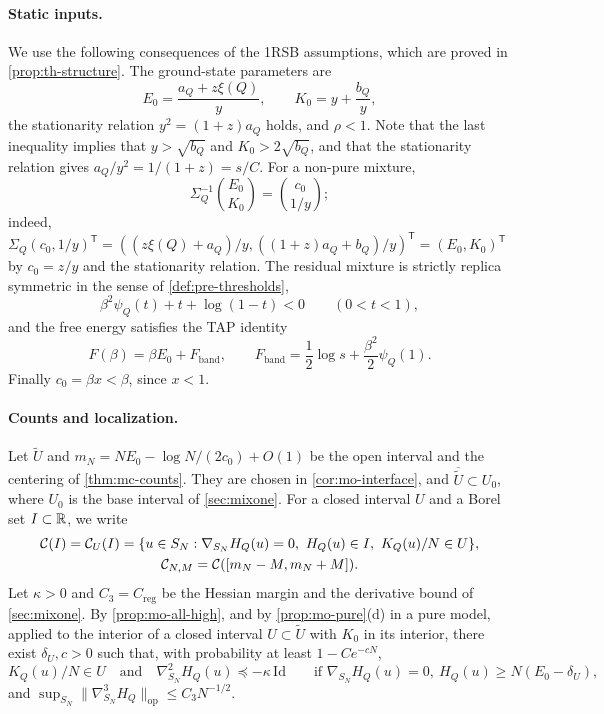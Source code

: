\paragraph{Static inputs.}
We use the following consequences of the 1RSB assumptions, which are proved in \cref{prop:th-structure}. The ground-state parameters are
\begin{equation}\label{eq:mb-marks}
E_0=\frac{a_Q+z\xi(Q)}{y},\qquad K_0=y+\frac{b_Q}{y},
\end{equation}
the stationarity relation $y^2=(1+z)a_Q$ holds, and $\rho<1$. Note that the last inequality implies that $y>\sqrt{b_Q}$ and $K_0>2\sqrt{b_Q}$, and that the stationarity relation gives $a_Q/y^2=1/(1+z)=s/C$. For a non-pure mixture,
\begin{equation}\label{eq:mb-score}
\Sigma_Q^{-1}\binom{E_0}{K_0}=\binom{c_0}{1/y};
\end{equation}
indeed, $\Sigma_Q(c_0,1/y)^{\mathsf T}=((z\xi(Q)+a_Q)/y,((1+z)a_Q+b_Q)/y)^{\mathsf T}=(E_0,K_0)^{\mathsf T}$ by $c_0=z/y$ and the stationarity relation. The residual mixture is strictly replica symmetric in the sense of \cref{def:pre-thresholds},
\begin{equation}\label{eq:mb-residual-rs}
\beta^2\psi_Q(t)+t+\log(1-t)<0\qquad(0<t<1),
\end{equation}
and the free energy satisfies the TAP identity
\begin{equation}\label{eq:mb-tap}
F(\beta)=\beta E_0+F_{\mathrm{band}},\qquad F_{\mathrm{band}}=\frac12\log s+\frac{\beta^2}2\psi_Q(1).
\end{equation}
Finally $c_0=\beta x<\beta$, since $x<1$.

\paragraph{Counts and localization.}
Let $\widetilde U$ and $m_N=NE_0-\log N/(2c_0)+O(1)$ be the open interval and the centering of \cref{thm:mc-counts}. They are chosen in \cref{cor:mo-interface}, and $\overline{\widetilde U}\subset U_0$, where $U_0$ is the base interval of \cref{sec:mixone}. For a closed interval $U$ and a Borel set $I\subset\mathbb R$, we write
\begin{equation}\label{eq:mb-centers}
\begin{gathered}
\cC(I)=\cC_U(I)=\{u\in S_N:\nabla_{S_N}H_Q(u)=0,\ H_Q(u)\in I,\ K_Q(u)/N\in U\},\\
\cC_{N,M}=\cC([m_N-M,m_N+M]).
\end{gathered}
\end{equation}
Let $\kappa>0$ and $C_3=C_{\mathrm{reg}}$ be the Hessian margin and the derivative bound of \cref{sec:mixone}. By \cref{prop:mo-all-high}, and by \cref{prop:mo-pure}(d) in a pure model, applied to the interior of a closed interval $U\subset\widetilde U$ with $K_0$ in its interior, there exist $\delta_U,c>0$ such that, with probability at least $1-Ce^{-cN}$,
\begin{equation}\label{eq:mb-allhigh}
K_Q(u)/N\in U\quad\text{and}\quad\nabla^2_{S_N}H_Q(u)\preceq-\kappa\,\mathrm{Id}\qquad\text{if }\nabla_{S_N}H_Q(u)=0,\ H_Q(u)\ge N(E_0-\delta_U),
\end{equation}
and $\sup_{S_N}\|\nabla^3_{S_N}H_Q\|_{\mathrm{op}}\le C_3N^{-1/2}$.

